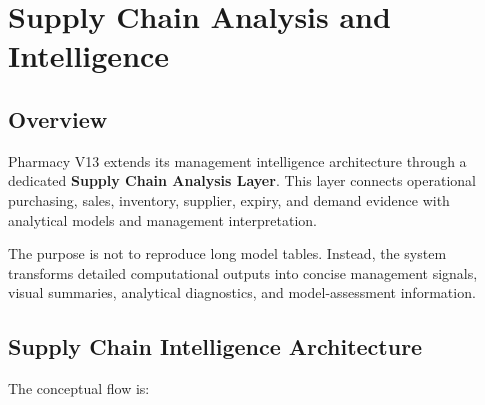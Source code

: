 \documentclass[12pt]{article}
\begin{document}
\begin{abstract}
The overall objective is to establish a scientifically defensible and
evidence-traceable pathway from observed pharmacy transactions to reliable
historical knowledge, validated analytical models, risk-aware prediction,
responsible optimisation, and accountable management action. In this
architecture, artificial intelligence and statistical modelling inform
management; they do not replace human judgement or organisational
responsibility.

\end{abstract}

\tableofcontents 


\newpage


\section{Supply Chain Analysis and Intelligence}

\subsection{Overview}

Pharmacy V13 extends its management intelligence architecture through a
dedicated \textbf{Supply Chain Analysis Layer}. This layer connects
operational purchasing, sales, inventory, supplier, expiry, and demand
evidence with analytical models and management interpretation.

The purpose is not to reproduce long model tables. Instead, the system
transforms detailed computational outputs into concise management signals,
visual summaries, analytical diagnostics, and model-assessment information.

\subsection{Supply Chain Intelligence Architecture}

The conceptual flow is:
\end{document}
